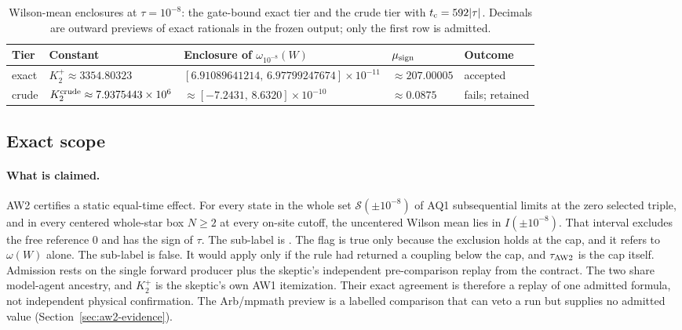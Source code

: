 \begin{table}[htbp]
\centering\small
\caption{Wilson-mean enclosures at $\tau=10^{-8}$: the gate-bound exact tier
and the crude tier with $t_{\rm c}=592|\tau|$. Decimals are outward previews of
exact rationals in the frozen output; only the first row is admitted.}
\label{tab:aw2-tiers}
\begin{tabular}{@{}lllll@{}}
\toprule
Tier & Constant & Enclosure of $\omega_{10^{-8}}(W)$ & $\mu_{\rm sign}$ & Outcome\\
\midrule
exact & $K_2^+\approx3354.80323$ &
$[6.91089641214,\,6.97799247674]\times10^{-11}$ & $\approx207.00005$ &
accepted\\
crude & $K_2^{\rm crude}\approx7.9375443\times10^{6}$ &
$\approx[-7.2431,\,8.6320]\times10^{-10}$ & $\approx0.0875$ &
fails; retained\\
\bottomrule
\end{tabular}
\end{table}

\subsection{Exact scope}
\label{sec:aw2-scope}
\paragraph{What is claimed.}
AW2 certifies a static equal-time effect. For every state in the whole set
$\mathcal S(\pm10^{-8})$ of AQ1 subsequential limits at the zero selected
triple, and in every centered whole-star box $N\ge2$ at every on-site cutoff,
the uncentered Wilson mean lies in $I(\pm10^{-8})$. That interval excludes the
free reference $0$ and has the sign of $\tau$. The sub-label is
. The flag  is
true only because the exclusion holds at the cap, and it refers to
$\omega(W)$ alone. The sub-label  is false. It
would apply only if the rule had returned a coupling below the cap, and
$\tau_{\rm AW2}$ is the cap itself. Admission rests on the single forward
producer plus the skeptic's independent pre-comparison replay from the
contract. The two share model-agent ancestry, and $K_2^+$ is the skeptic's own
AW1 itemization. Their exact agreement is therefore a replay of one admitted
formula, not independent physical confirmation. The Arb/mpmath preview is a
labelled comparison that can veto a run but supplies no admitted value
(Section~\ref{sec:aw2-evidence}).

